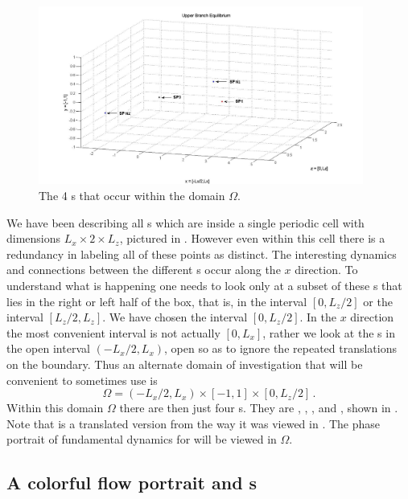 \documentclass[lineno]{jfm}
\begin{document}
 \begin{figure}
\includegraphics[width=0.95\textwidth]{stagps2_edited.jpg}
  \caption{
   The 4 \stagp s that occur within the domain $\Omega$.
   }
  \label{fig:stagps_label2}
 \end{figure}

We have been describing all \stagp s which are inside a single periodic 
cell with dimensions $L_x \times 2 \times L_z$, pictured in 
. However even within this cell there is a 
redundancy in labeling all of these points as distinct. The interesting 
dynamics and connections between the different \stagp s occur along the 
$x$ direction. To understand what is happening one needs to look only at 
a subset of these \stagp s that lies in the right or left half of the 
box, that is, in the interval $[0,L_{z}/2]$ or the interval 
$[L_{z}/2,L_{z}]$. We have chosen the interval $[0,L_{z}/2]$. In the $x$ 
direction the most convenient interval is not actually $[0,L_{x}]$, 
rather we look at the \stagp s in the open interval $(-L_{x}/2,L_{x})$, 
open so as to ignore the repeated translations on the boundary. Thus an 
alternate domain of investigation that will be convenient to sometimes 
use is 
\[ %
\Omega = (-L_{x}/2,L_{x}) \times [-1,1] \times [0,L_{z}/2]
\,. 
\] %
Within this domain $\Omega$ there are then just four \stagp s. They 
are , , , and , shown in 
. Note that  is a translated 
version from the way it was viewed in . The 
phase portrait of fundamental dynamics for {\tEQtwo} will be viewed in 
$\Omega$.


\subsection{A colorful flow portrait and {\hc}s}
\end{document}
